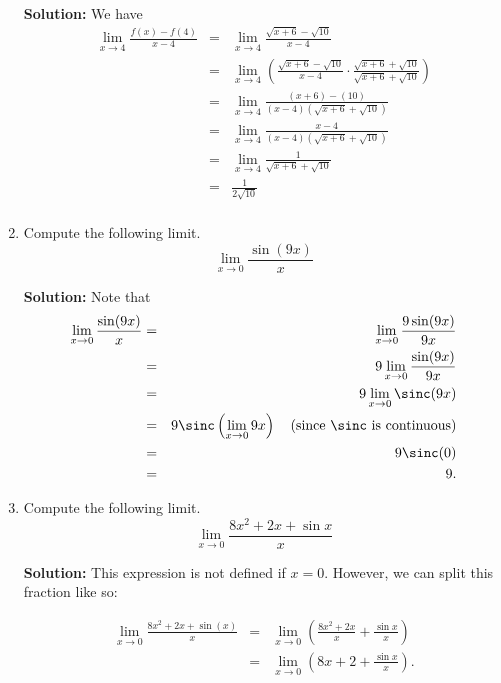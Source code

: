 \documentclass{article}
\begin{document}
\begin{enumerate}
\textbf{Solution:} We have
\begin{eqnarray*}
\lim_{x \rightarrow 4} \frac{f(x) - f(4)}{x - 4} & = & \lim_{x \rightarrow 4} \frac{\sqrt{x + 6} - \sqrt{10}}{x - 4} \\
 & = & \lim_{x \rightarrow 4} \left( \frac{\sqrt{x + 6} - \sqrt{10}}{x - 4} \cdot \frac{\sqrt{x + 6} + \sqrt{10}}{\sqrt{x + 6} + \sqrt{10}} \right) \\
 & = & \lim_{x \rightarrow 4} \frac{(x + 6) - (10)}{(x - 4)\left( \sqrt{x + 6} + \sqrt{10} \right)} \\
 & = & \lim_{x \rightarrow 4} \frac{x - 4}{(x - 4)\left( \sqrt{x + 6} + \sqrt{10} \right)} \\
 & = & \lim_{x \rightarrow 4} \frac{1}{\sqrt{x + 6} + \sqrt{10}} \\
 & = & \frac{1}{2\sqrt{10}} \\
\end{eqnarray*}


  
\vspace{1cm}

\item Compute the following limit. \[ \lim_{x \rightarrow 0} \frac{\sin(9 x)}{x} \]

\textbf{Solution:} Note that
\begin{eqnarray*}
\lim_{x \rightarrow 0} \frac{\sin(9 x)}{x}
 & = & \lim_{x \rightarrow 0} \frac{9\sin(9 x)}{9 x} \\
 & = & 9 \lim_{x \rightarrow 0} \frac{\sin(9 x)}{9 x} \\
 & = & 9 \lim_{x \rightarrow 0} \sinc(9 x) \\
 & = & 9 \sinc\left( \lim_{x \rightarrow 0} 9 x \right) \quad \mathrm{(since}\ \sinc\ \mathrm{is\ continuous)} \\
 & = & 9 \sinc(0) \\
 & = & 9.
\end{eqnarray*}


  
\vspace{1cm}

\item Compute the following limit. \[ \lim_{x \rightarrow 0} \frac{8 x^2 + 2 x + \sin x}{x} \]

\textbf{Solution:} This expression is not defined if $x = 0$. However, we can split this fraction like so:

\begin{eqnarray*}
\lim_{x \rightarrow 0} \frac{8 x^2 + 2 x + \sin(x)}{x}
 & = & \lim_{x \rightarrow 0} \left( \frac{8 x^2 + 2 x}{x} + \frac{\sin x}{x} \right) \\
 & = & \lim_{x \rightarrow 0} \left( 8 x + 2 + \frac{\sin x}{x} \right). \\
\end{eqnarray*}


\end{enumerate}
\end{document}
